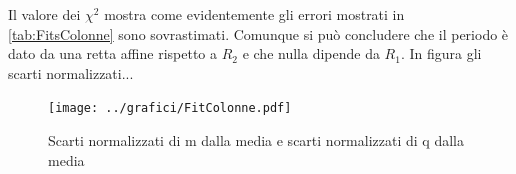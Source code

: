 \documentclass[a4paper,10pt]{article}
\begin{document}
Il valore dei $\chi^2$ mostra come evidentemente gli errori mostrati in \cref{tab:FitsColonne} sono sovrastimati. Comunque si può concludere che il periodo è dato da una retta affine rispetto a $R_2$ e che nulla dipende da $R_1$. In figura gli scarti normalizzati...

 
\begin{figure}[H]
	\centering
	\texttt{[image: ../grafici/FitColonne.pdf]}
	\caption{Scarti normalizzati di m dalla media e scarti normalizzati di q dalla media}
	\label{fig:FitColonne}
\end{figure}
\end{document}
